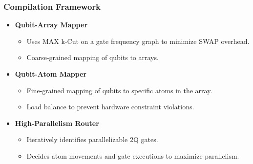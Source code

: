 \documentclass[18 pt]{beamer}
\begin{document}
\begin{frame}
    \frametitle{Compilation Framework}
    \begin{itemize}
        \item \textbf{Qubit-Array Mapper}
        \begin{itemize}
            \item Uses MAX k-Cut on a gate frequency graph to minimize SWAP overhead.
            \item Coarse-grained mapping of qubits to arrays.
        \end{itemize}
        \item \textbf{Qubit-Atom Mapper}
        \begin{itemize}
            \item Fine-grained mapping of qubits to specific atoms in the array.
            \item Load balance to prevent hardware constraint violations.
        \end{itemize}
        \item \textbf{High-Parallelism Router}
        \begin{itemize}
            \item Iteratively identifies parallelizable 2Q gates.
            \item Decides atom movements and gate executions to maximize parallelism.
        \end{itemize}
    \end{itemize}
\end{frame}

            
\end{document}
